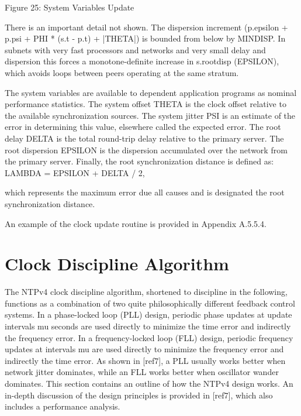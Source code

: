                 Figure 25: System Variables Update

There is an important detail not shown.  The dispersion increment
(p.epsilon + p.psi + PHI * (s.t - p.t) + |THETA|) is bounded from
below by MINDISP.  In subnets with very fast processors and networks
and very small delay and dispersion this forces a monotone-definite
increase in s.rootdisp (EPSILON), which avoids loops between peers
operating at the same stratum.

The system variables are available to dependent application programs
as nominal performance statistics.  The system offset THETA is the
clock offset relative to the available synchronization sources.  The
system jitter PSI is an estimate of the error in determining this
value, elsewhere called the expected error.  The root delay DELTA is
the total round-trip delay relative to the primary server.  The root
dispersion EPSILON is the dispersion accumulated over the network
from the primary server.  Finally, the root synchronization distance
is defined as:
LAMBDA = EPSILON + DELTA / 2,

which represents the maximum error due all causes and is designated
the root synchronization distance.

An example of the clock update routine is provided in
Appendix A.5.5.4.

\section{Clock Discipline Algorithm}

The NTPv4 clock discipline algorithm, shortened to discipline in the
following, functions as a combination of two quite philosophically
different feedback control systems.  In a phase-locked loop (PLL)
design, periodic phase updates at update intervals mu seconds are
used directly to minimize the time error and indirectly the frequency
error.  In a frequency-locked loop (FLL) design, periodic frequency
updates at intervals mu are used directly to minimize the frequency
error and indirectly the time error.  As shown in [ref7], a PLL
usually works better when network jitter dominates, while an FLL
works better when oscillator wander dominates.  This section contains
an outline of how the NTPv4 design works.  An in-depth discussion of
the design principles is provided in [ref7], which also includes a
performance analysis.

